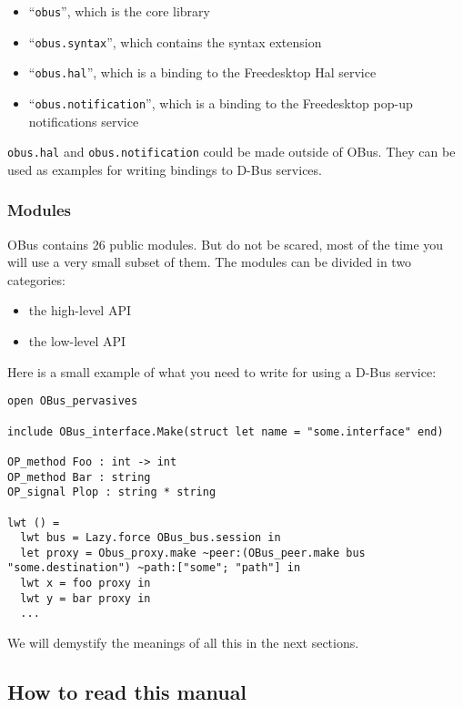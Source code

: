 \documentclass{article}
\begin{document}
\begin{itemize}
\item ``\texttt{obus}'', which is the core library
\item ``\texttt{obus.syntax}'', which contains the syntax extension
\item ``\texttt{obus.hal}'', which is a binding to the Freedesktop
  Hal service
\item ``\texttt{obus.notification}'', which is a binding to the
  Freedesktop pop-up notifications service
\end{itemize}

\texttt{obus.hal} and \texttt{obus.notification} could be made outside
of OBus. They can be used as examples for writing bindings to D-Bus
services.

\subsubsection{Modules}

OBus contains 26 public modules. But do not be scared, most of the
time you will use a very small subset of them. The modules can be
divided in two categories:

\begin{itemize}
\item the high-level API
\item the low-level API
\end{itemize}

Here is a small example of what you need to write for using a D-Bus
service:

\begin{verbatim}
open OBus_pervasives

include OBus_interface.Make(struct let name = "some.interface" end)

OP_method Foo : int -> int
OP_method Bar : string
OP_signal Plop : string * string

lwt () =
  lwt bus = Lazy.force OBus_bus.session in
  let proxy = Obus_proxy.make ~peer:(OBus_peer.make bus "some.destination") ~path:["some"; "path"] in
  lwt x = foo proxy in
  lwt y = bar proxy in
  ...
\end{verbatim}

We will demystify the meanings of all this in the next sections.

\subsection{How to read this manual}
\end{document}
